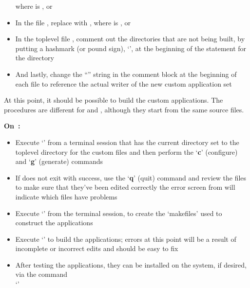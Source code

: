 \begin{itemize}
where  is ,  or\\
\item\exSp{}In the file , replace
 with ,
where  is ,  or 
\item\exSp{}In the top\longDash{}level file , comment out the
directories that are not being built, by putting a hash\longDash{}mark (or pound sign),
`\asCode{\#}', at the beginning of the  statement
for the directory
\item\exSp{}And lastly, change the ``'' string in the comment block at
the beginning of each file to reference the actual writer of the new custom application
set
\end{itemize}
\tertiaryEnd
{}
At this point, it should be possible to build the custom applications.
The procedures are different for \osx{} and \win{}, although they start from the same
source files. 
\begin{center}\textbf{On~\osx:}\end{center}
\begin{itemize}
\item Execute `' from a terminal session that has the current directory
set to the top\longDash{}level directory for the custom files and then perform the
`\textbf{c}' (configure) and `\textbf{g}' (generate) commands
\item\exSp{}If  does not exit with success, use the `\textbf{q}' (quit)
command and review the  files to make sure that they've been edited
correctly \longDash{} the error screen from  will indicate which files have
problems
\item\exSp{}Execute `' from the terminal session, to create the
`makefiles' used to construct the applications
\item\exSp{}Execute `' to build the applications; errors at
this point will be a result of incomplete or incorrect edits and should be easy to fix
\item\exSp{}After testing the applications, they can be installed on the system, if
desired, via the command\\
`'
\end{itemize}
